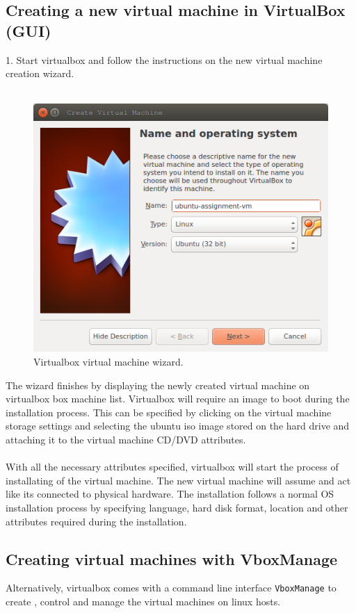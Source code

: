 \documentclass[12pt]{article}
\begin{document}
\subsection{Creating a new virtual machine in VirtualBox (GUI)}
1. Start virtualbox and follow the instructions on the new virtual machine creation wizard.
\\\\
\begin{figure}[h!]
\centering
\includegraphics[width=1.0\textwidth]{new-vm.png}
\caption{\label{fig:resouce}Virtualbox virtual machine wizard.}
\end{figure}

The wizard finishes by displaying the newly created virtual machine on virtualbox box machine list. Virtualbox will require an image to boot during the installation process. This can be specified by clicking on the virtual machine storage settings and selecting the ubuntu iso image stored on the hard drive and attaching it to the virtual machine CD/DVD attributes. 
\\\\
With all the necessary attributes specified, virtualbox will start the process of installating of the virtual machine. The new virtual machine will assume and act like its connected to physical hardware. The installation follows a normal OS installation process by specifying language, hard disk format, location and other attributes required during the installation.

\subsection{Creating virtual machines with VboxManage}
Alternatively, virtualbox comes with a command line interface \texttt{VboxManage} to create , control and manage the virtual machines on linux hosts.
\end{document}
